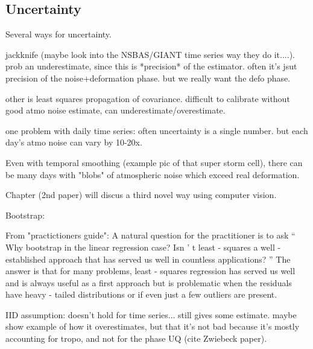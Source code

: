 

\subsection{Uncertainty}
\label{sec:ch3-eq-tropo}
Several ways for uncertainty.

jackknife (maybe look into the NSBAS/GIANT time series way they do it....). prob an underestimate, since this is *precision* of the estimator. often it's jsut precision of the noise+deformation phase. but we really want the defo phase.

other is least squares propagation of covariance. difficult to calibrate without good atmo noise estimate, can underestimate/overestimate.

one problem with daily time series: often uncertainty is a single number. but each day's atmo noise can vary by 10-20x.

Even with temporal smoothing (example pic of that super storm cell), there can be many days with "blobs" of atmospheric noise which exceed real deformation.

Chapter (2nd paper) will discus a third novel way using computer vision.


Bootstrap:

From "practictioners guide":
A natural question for the practitioner is to ask  “ Why bootstrap in the linear regression case? Isn ’ t least - squares a well - established approach that  has  served  us  well  in  countless  applications? ”   The  answer  is  that  for  many  problems, least - squares regression has served us well and is always useful as  a first approach but is problematic when the residuals have heavy - tailed distributions or if even just a few outliers are present.

IID assumption: doesn't hold for time series... still gives some estimate. maybe show example of how it overestimates, but that it's not bad because it's mostly accounting for tropo, and not for the phase UQ (cite Zwiebeck paper).






